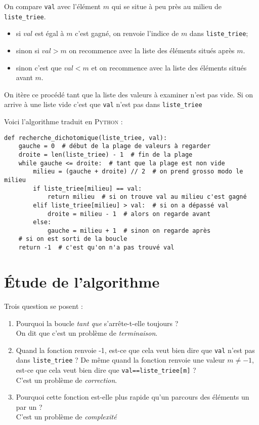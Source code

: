 \begin{methode}[]
On compare \texttt{val} avec l'élément $m$ qui se situe \og à peu près au milieu de \texttt{liste_triee}\fg{}.
\begin{itemize}
    \item   si $val$ est égal à $m$ c'est gagné, on renvoie l'indice de $m$ dans  \texttt{liste_triee};
    \item   sinon si $val>m$ on recommence avec la liste des éléments situés après $m$.
    \item   sinon c'est que $val<m$ et on recommence avec la liste des éléments situés avant $m$.
\end{itemize}
On itère ce procédé tant que la liste des valeurs à examiner n'est pas vide. Si on arrive à une liste vide c'est que \texttt{val} n'est pas dans \texttt{liste_triee}
\end{methode}
Voici l'algorithme traduit en \textsc{Python} :
\begin{pys}
\begin{verbatim}
def recherche_dichotomique(liste_triee, val):
    gauche = 0  # début de la plage de valeurs à regarder
    droite = len(liste_triee) - 1  # fin de la plage
    while gauche <= droite:  # tant que la plage est non vide
        milieu = (gauche + droite) // 2  # on prend grosso modo le milieu
        if liste_triee[milieu] == val:
            return milieu  # si on trouve val au milieu c'est gagné
        elif liste_triee[milieu] > val:  # si on a dépassé val
            droite = milieu - 1  # alors on regarde avant
        else:
            gauche = milieu + 1  # sinon on regarde après
    # si on est sorti de la boucle
    return -1  # c'est qu'on n'a pas trouvé val
\end{verbatim}
\end{pys}

\section{\'Etude de l'algorithme}

Trois question se posent :

\begin{enumerate}
    \item   Pourquoi la boucle \textit{tant que} s'arrête-t-elle toujours ?\\ On dit que c'est un problème de \textit{terminaison}.
    \item   Quand la fonction renvoie -1, est-ce que cela veut bien dire que \texttt{val} n'est pas dans \texttt{liste_triee} ? De même quand la fonction renvoie une valeur $m\neq -1$, est-ce que cela veut bien dire que \texttt{val==liste_triee[m]} ?\\
    C'est un problème de \textit{correction}.
    \item   Pourquoi cette fonction est-elle plus rapide qu'un parcours des éléments un par un ?\\ C'est un problème de \textit{complexité}
\end{enumerate}

